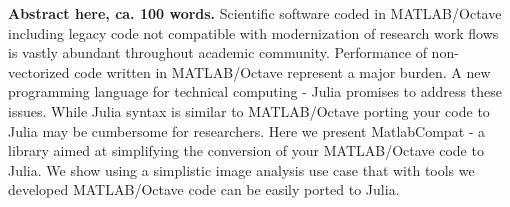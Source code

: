 \textbf{Abstract here, ca. 100 words.}
Scientific software coded in MATLAB/Octave including legacy code not compatible with modernization of research work flows is vastly abundant throughout academic community. Performance of non-vectorized code written in MATLAB/Octave represent a major burden. A new programming language for technical computing - Julia promises to address these issues. While Julia syntax is similar to MATLAB/Octave porting your code to Julia may be cumbersome for researchers. Here we present MatlabCompat - a library aimed at simplifying the conversion of your MATLAB/Octave code to Julia. We show using a simplistic image analysis use case that with tools we developed MATLAB/Octave code can be easily ported to Julia.